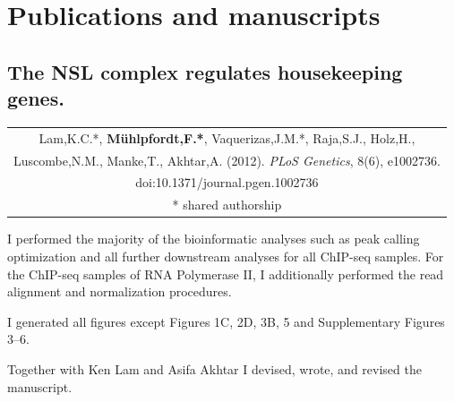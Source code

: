 
\newcommand{\overbox}[2][l]{%
  \colorbox{Light}{\begin{tabular}{@{}#1@{}}#2\end{tabular}}%
}

\chapter{Publications and manuscripts} %
%
\fancyhead{}
\fancyfoot[C]{\thepage}

\section{The NSL complex regulates housekeeping genes.}
\label{SuppPub_NSL} %

\begin{center}
\noindent\overbox[c]{
Lam,\:K.\:C.*, \textbf{M{\"u}hlpfordt,\:F.*}, Vaquerizas,\:J.\:M.*, Raja,\:S.\:J., Holz,\:H.,\\
Luscombe,\:N.\:M., Manke,\:T., Akhtar,\:A. (2012). \textit{PLoS Genetics}, 8(6), e1002736.\\
doi:10.1371/journal.pgen.1002736 \\
* shared authorship}
\end{center}

I performed the majority of the bioinformatic analyses such as peak calling optimization 
and all further downstream analyses for all ChIP-seq samples. For the ChIP-seq samples of RNA Polymerase II, I additionally performed the read alignment and normalization procedures. 

I generated all figures except Figures 1C, 2D, 3B, 5 and Supplementary Figures 3--6. 

Together with Ken Lam and Asifa Akhtar I devised, wrote, and revised the manuscript.


